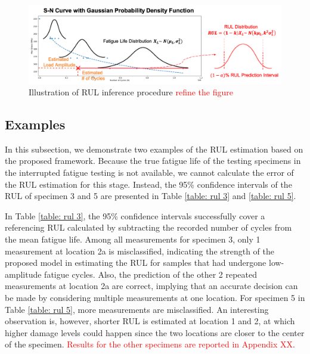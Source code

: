 \begin{figure}[tb]
    \includegraphics[width=\linewidth]{fig/rul_inference_procedure.png}
    \caption{Illustration of RUL inference procedure \textcolor{red}{refine the figure}}
    \label{fig: rul infer procedure}
\end{figure}

\subsection{Examples}
In this subsection, we demonstrate two examples of the RUL estimation based on the proposed framework. Because the true fatigue life of the testing specimens in the interrupted fatigue testing is not available, we cannot calculate the error of the RUL estimation for this stage. Instead, the 95\% confidence intervals of the RUL of specimen 3 and 5 are presented in Table \ref{table: rul 3} and \ref{table: rul 5}. 

In Table \ref{table: rul 3}, the 95\% confidence intervals successfully cover a referencing RUL calculated by subtracting the recorded number of cycles from the mean fatigue life. Among all measurements for specimen 3, only 1 measurement at location 2a is misclassified, indicating the strength of the proposed model in estimating the RUL for samples that had undergone low-amplitude fatigue cycles. Also, the prediction of the other 2 repeated measurements at location 2a are correct, implying that an accurate decision can be made by considering multiple measurements at one location. For specimen 5 in Table \ref{table: rul 5}, more measurements are misclassified. An interesting observation is, however, shorter RUL is estimated at location 1 and 2, at which higher damage levels could happen since the two locations are closer to the center of the specimen. \textcolor{red}{Results for the other specimens are reported in Appendix XX}.

